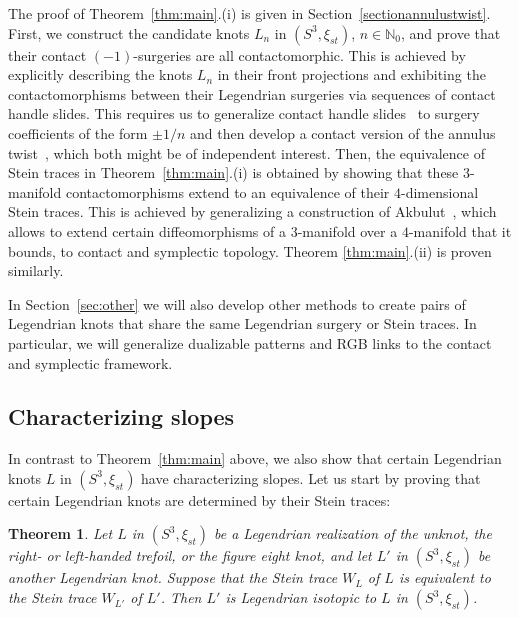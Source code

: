 \documentclass[11pt]{amsart} %
\newcommand{\N}{\mathbb{N}}
\theoremstyle{plain}
\newtheorem{thm}[Theorem]{Theorem}
\theoremstyle{definition}
\begin{document}
The proof of Theorem~\ref{thm:main}.(i) is given in Section~\ref{sectionannulustwist}. First, we construct the candidate knots $L_n$ in $(S^3,\xi_{st})$, $n\in\N_0$, and prove that their contact $(-1)$-surgeries are all contactomorphic. This is achieved by explicitly describing the knots $L_n$ in their front projections and exhibiting the contactomorphisms between their Legendrian surgeries via sequences of contact handle slides. This requires us to generalize contact handle slides~\cite{DingGeiges09} to surgery coefficients of the form $\pm1/n$ and then develop a contact version of the annulus twist~\cite{Osoinach06}, which both might be of independent interest. Then, the equivalence of Stein traces in Theorem~\ref{thm:main}.(i) is obtained by showing that these $3$-manifold contactomorphisms extend to an equivalence of their $4$-dimensional Stein traces. This is achieved by generalizing a construction of Akbulut~\cite{Akbulut77}, which allows to extend certain diffeomorphisms of a $3$-manifold over a $4$-manifold that it bounds, to contact and symplectic topology. Theorem \ref{thm:main}.(ii) is proven similarly.

In Section~\ref{sec:other} we will also develop other methods to create pairs of Legendrian knots that share the same Legendrian surgery or Stein traces. In particular, we will generalize dualizable patterns \cite{Brakes80, MillerPiccirillo18} and RGB links \cite{Piccirillo19,Tagami1} to the contact and symplectic framework.

\subsection{Characterizing slopes}\label{sec:main_char}
In contrast to Theorem~\ref{thm:main} above, we also show that certain Legendrian knots $L$ in $(S^3,\xi_{st})$ have characterizing slopes. Let us start by proving that certain Legendrian knots are determined by their Stein traces: 
\begin{thm}\label{Steinchar}
Let $L$ in $(S^3,\xi_{st})$ be a Legendrian realization of the unknot, the right- or left-handed trefoil, or the figure eight knot, and let $L'$ in $(S^3,\xi_{st})$ be another Legendrian knot. Suppose that the Stein trace $W_L$ of $L$ is equivalent to the Stein trace $W_{L'}$ of $L'$. Then $L'$ is Legendrian isotopic to $L$ in $(S^3,\xi_{st})$. 
\end{thm}
\end{document}
